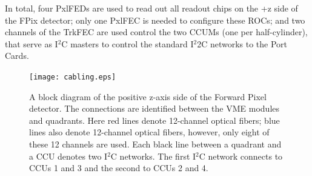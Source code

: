 \documentclass{cmspaper}
\begin{document}
In total, four PxlFEDs are used to read out all readout chips on the +z side of the FPix detector;
only one PxlFEC is needed to configure these ROCs;
and two channels of the TrkFEC are used control the two CCUMs (one per half-cylinder), 
that serve as I$^{2}$C masters to control the standard I$^{2}$2C networks to the Port Cards. 


 


\begin{figure}[hbtp]   
  \begin{center}   
        \texttt{[image: cabling.eps]}   
    \caption{A block diagram of the positive z-axis side of the Forward Pixel detector. 
             The connections are identified between the VME modules and quadrants. 
             Here red lines denote 12-channel optical fibers; 
             blue lines also denote 12-channel optical fibers, however, 
             only eight of these 12 channels are used.
             Each black line between a quadrant and a CCU denotes two I$^{2}$C networks.
             The first I$^{2}$C network connects to CCUs 1 and 3 and the second to CCUs 2 and 4.}
    \label{figure:cabling} 
  \end{center}   
\end{figure} 


\end{document}

